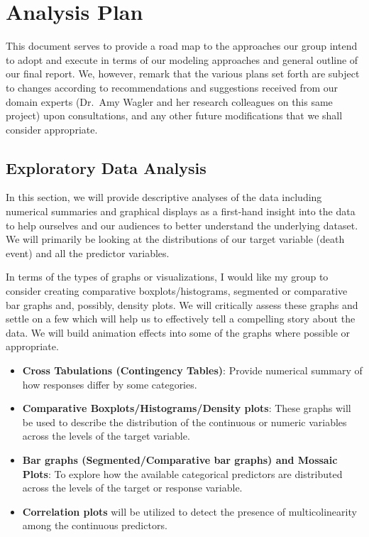 \documentclass[
  10pt,
]{article}
\begin{document}
\section{Analysis Plan}

This document serves to provide a road map to the approaches our group intend to adopt and execute in terms of our modeling approaches and general outline of our final report. We, however, remark that the various plans set forth are subject to changes according to recommendations and suggestions received from our domain experts (Dr.~Amy Wagler and her research colleagues on this same project) upon consultations, and any other future modifications that we shall consider appropriate.

\subsection{Exploratory Data Analysis}

In this section, we will provide descriptive analyses of the data including numerical summaries and graphical displays as a first-hand insight into the data to help ourselves and our audiences to better understand the underlying dataset. We will primarily be looking at the distributions of our target variable (death event) and all the predictor variables.

In terms of the types of graphs or visualizations, I would like my group to consider creating comparative boxplots/histograms, segmented or comparative bar graphs and, possibly, density plots. We will critically assess these graphs and settle on a few which will help us to effectively tell a compelling story about the data. We will build animation effects into some of the graphs where possible or appropriate.

\begin{itemize}
\item
  \textbf{Cross Tabulations (Contingency Tables)}: Provide numerical summary of how responses differ by some categories.
\item
  \textbf{Comparative Boxplots/Histograms/Density plots}: These graphs will be used to describe the distribution of the continuous or numeric variables across the levels of the target variable.
\item
  \textbf{Bar graphs (Segmented/Comparative bar graphs) and Mossaic Plots}: To explore how the available categorical predictors are distributed across the levels of the target or response variable.
\item
  \textbf{Correlation plots} will be utilized to detect the presence of multicolinearity among the continuous predictors.
\end{itemize}
\end{document}
